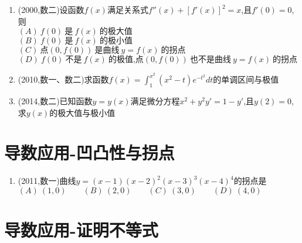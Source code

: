 \documentclass[12pt, a4paper, oneside, UTF8]{ctexbook}
\begin{document}
\begin{enumerate}[label=\arabic*.,start=17]
    \item  (2000,数二)设函数$f(x)$满足关系式$f''(x)+[f'(x)]^2=x$,且$f'(0)=0$,则 \\
    $(A)\ f(0)\ \text{是}\ f(x)\ \text{的极大值}$ \\
    $(B)\ f(0)\ \text{是}\ f(x)\ \text{的极小值}$ \\
    $(C)\ \text{点}(0,f(0))\ \text{是曲线}\ y=f(x)\ \text{的拐点}$ \\
    $(D)\ f(0)\ \text{不是}\ f(x)\ \text{的极值,点}(0,f(0))\ \text{也不是曲线}\ y=f(x)\ \text{的拐点}$
    
    \begin{solution}
    \newpage
    \end{solution}
    
    \item  (2010,数一、数二)求函数$f(x)=\int_1^{x^2}(x^2-t)e^{-t^2}dt$的单调区间与极值
    
    \begin{solution}
    \newpage
    \end{solution}
    
    \item  (2014,数二)已知函数$y=y(x)$满足微分方程$x^2+y^2y'=1-y'$,且$y(2)=0$,求$y(x)$的极大值与极小值
    
    \begin{solution}
    \newpage
    \end{solution}
\end{enumerate}

\section{导数应用-凹凸性与拐点}

\begin{enumerate}[label=\arabic*.,start=20]
    \item  (2011,数一)曲线$y=(x-1)(x-2)^2(x-3)^3(x-4)^4$的拐点是 \\
    $(A)\ (1,0) \qquad (B)\ (2,0) \qquad (C)\ (3,0) \qquad (D)\ (4,0)$
    
    \begin{solution}
    \newpage
    \end{solution}
\end{enumerate}

\section{导数应用-证明不等式}
\end{document}
